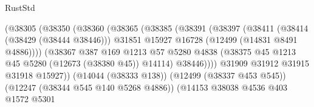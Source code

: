 \begin{lexlean}{RustStd}
\begin{coremodule}
                                          (@38305
                                            (@38350
                                              (@38360
                                                (@38365
                                                  (@38385
                                                    (@38391
                                                      (@38397
                                                        (@38411
                                                          (@38414 (@38429 (@38444 @38446)))
                                                          @31851
                                                          @15927
                                                          @16728
                                                          (@12499 (@14831 @8491 @4886))))
                                                      (@38367
                                                        @387
                                                        @169
                                                        @1213
                                                        @57
                                                        @5280
                                                        @4838
                                                        (@38375
                                                          @45
                                                          @1213
                                                          @45
                                                          @5280
                                                          (@12673 (@38380 @45))
                                                          @14114)
                                                        @38446))))
                                                @31909
                                                @31912
                                                @31915
                                                @31918
                                                @15927))
                                            (@14044 (@38333 @138))
                                            (@12499 (@38337 @453 @545))
                                            (@12247 (@38344 @545 @140 @5268 @4886))
                                            (@14153
                                              @38038
                                              @4536
                                              @403
                                              @1572
                                              @5301

\end{coremodule}
\end{lexlean}
